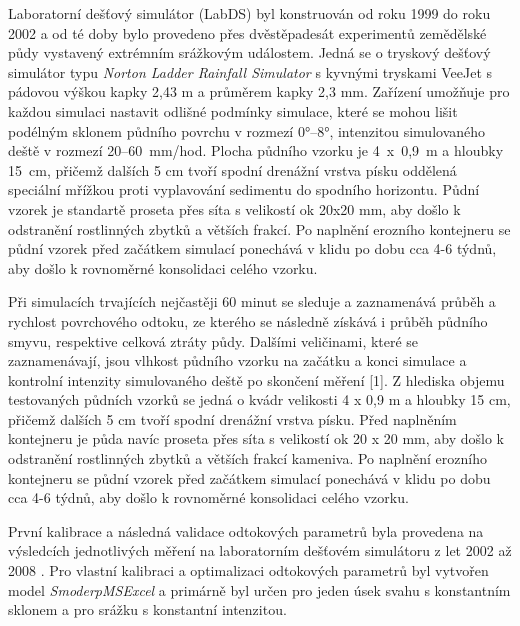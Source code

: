 \label{sss:zlab}
Laboratorní dešťový simulátor (LabDS) byl konstruován od roku 1999 do roku 2002 a od té doby bylo provedeno přes dvěstěpadesát experimentů zemědělské půdy vystavený extrémním srážkovým událostem. Jedná se o tryskový dešťový simulátor typu \textit{Norton Ladder Rainfall Simulator} \cite{Norton2010} s kyvnými tryskami VeeJet s pádovou výškou kapky 2,43 m a průměrem kapky 2,3 mm. Zařízení umožňuje pro každou simulaci nastavit odlišné podmínky simulace, které se mohou lišit podélným sklonem půdního povrchu v rozmezí 0°–8°, intenzitou simulovaného deště v rozmezí 20–60~mm/hod. 
Plocha půdního vzorku je 4~x~0,9~m a hloubky 15~cm, přičemž dalších 5 cm tvoří spodní drenážní vrstva písku oddělená speciální mřížkou proti vyplavování sedimentu do spodního horizontu. Půdní vzorek je standartě proseta přes síta s velikostí ok 20x20 mm, aby došlo k odstranění rostlinných zbytků a větších frakcí. Po naplnění erozního kontejneru se půdní vzorek před začátkem simulací ponechává v klidu po dobu cca 4-6 týdnů, aby došlo k rovnoměrné konsolidaci celého vzorku.



Při simulacích trvajících nejčastěji 60 minut se sleduje a zaznamenává průběh a rychlost povrchového odtoku, ze kterého se následně získává i průběh půdního smyvu, respektive celková ztráty půdy. Dalšími veličinami, které se zaznamenávají, jsou vlhkost půdního vzorku na začátku a konci simulace a kontrolní intenzity simulovaného deště po skončení měření [1]. 
Z hlediska objemu testovaných půdních vzorků se jedná o kvádr velikosti 4 x 0,9 m a hloubky 15 cm, přičemž dalších 5 cm tvoří spodní drenážní vrstva písku. Před naplněním kontejneru je půda navíc proseta přes síta s velikostí ok 20 x 20 mm, aby došlo k odstranění rostlinných zbytků a větších frakcí kameniva. Po naplnění erozního kontejneru se půdní vzorek před začátkem simulací ponechává v klidu po dobu cca 4-6 týdnů, aby došlo k rovnoměrné konsolidaci celého vzorku.

První kalibrace a následná validace odtokových parametrů byla provedena na výsledcích jednotlivých měření na laboratorním dešťovém simulátoru z let 2002 až 2008 \citep{KavkaDisertace}. Pro vlastní kalibraci a optimalizaci odtokových parametrů byl vytvořen model \textit{SmoderpMSExcel} a primárně byl určen pro jeden úsek svahu s konstantním sklonem a pro srážku s konstantní intenzitou.

